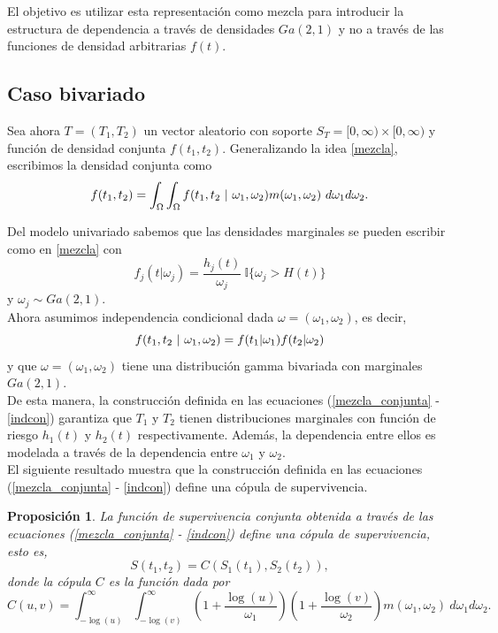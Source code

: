 \documentclass[11pt,a4paper]{article}
\newtheorem{proposition}{Proposición}[subsection]
\begin{document}
El objetivo es utilizar esta representación como mezcla para introducir la estructura de dependencia a través de densidades $Ga(2, 1)$ y no a través de las funciones de densidad arbitrarias $f(t)$.

\subsection{Caso bivariado} \label{caso_bivariado}
Sea ahora $T=(T_1, T_2)$ un vector aleatorio con soporte $S_T = [0, \infty) \times [0, \infty)$ y función de densidad conjunta $f(t_1, t_2)$. Generalizando la idea \eqref{mezcla}, escribimos la densidad conjunta como
\begin{equation} \label{mezcla_conjunta}
f(t_1, t_2) =\int_\Omega\int_\Omega f(t_1, t_2 \ | \ \omega_1, \omega_2)m(\omega_1, \omega_2) \ d\omega_1 d\omega_2.\\
\end{equation}

Del modelo univariado sabemos que las densidades marginales se pueden escribir como en \eqref{mezcla} con
\begin{equation} \label{marginal}
f_j(t|\omega_j) = \frac{h_j(t)}{\omega_j} \ \mathbb{I}\lbrace\omega_j > H(t)\rbrace
\end{equation}
y $\omega_j \sim Ga(2, 1)$.\\

Ahora asumimos independencia condicional dada $\omega = (\omega_1, \omega_2)$, es decir,
\begin{equation} \label{indcon}
f(t_1, t_2 \ | \ \omega_1, \omega_2) = f(t_1 | \omega_1)f(t_2 | \omega_2)\\
\end{equation}
y que $\omega = (\omega_1, \omega_2)$ tiene una distribución gamma bivariada con marginales $Ga(2, 1).$\\

De esta manera, la construcción definida en las ecuaciones (\ref{mezcla_conjunta} - \ref{indcon}) garantiza que $T_1$ y $T_2$ tienen distribuciones marginales con función de riesgo $h_1(t)$ y $h_2(t)$ respectivamente. Además, la dependencia entre ellos es modelada a través de la dependencia entre $\omega_1$ y $\omega_2$.\\

El siguiente resultado muestra que la construcción definida en las ecuaciones (\ref{mezcla_conjunta} - \ref{indcon}) define una cópula de supervivencia.

\begin{proposition}
La función de supervivencia conjunta obtenida a través de las ecuaciones (\ref{mezcla_conjunta} - \ref{indcon}) define una cópula de supervivencia, esto es, $$S(t_1, t_2) = C(S_1(t_1), S_2(t_2)),$$ donde la cópula $C$ es la función dada por
\begin{equation} \label{copula_modelo}
C(u, v) = \int_{-\log (u)}^\infty \int_{-\log (v)}^\infty \left(1 + \frac{\log(u)}{\omega_1}\right)\left(1 + \frac{\log(v)}{\omega_2}\right) m(\omega_1, \omega_2) \ d\omega_1 d \omega_2.
\end{equation}
\end{proposition}
\end{document}
